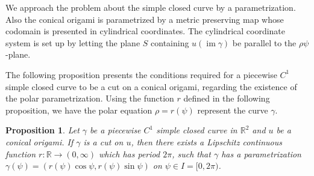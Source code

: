 \documentclass{amsart}
\theoremstyle{plain}
\newtheorem{proposition}[theorem]{Proposition}
\theoremstyle{definition}
\theoremstyle{remark}
\DeclareMathOperator{\im}{im}
\begin{document}
We approach the problem about the simple closed curve by a parametrization.
Also the conical origami is parametrized by a metric preserving map whose codomain is presented in cylindrical coordinates.
The cylindrical coordinate system is set up by letting the plane $S$ containing $u(\im\gamma)$ be parallel to the $\rho\psi$-plane. %

The following proposition presents the conditions required for a piecewise $C^1$ simple closed curve to be a cut on a conical origami, regarding the existence of the polar parametrization.
Using the function $r$ defined in the following proposition, we have the polar equation $\rho=r(\psi)$ represent the curve $\gamma$.



\begin{proposition}\label{2.1} %
Let $\gamma$ be a piecewise $C^1$ simple closed curve in $\mathbb{R}^2$ and $u$ be a conical origami. %
If $\gamma$ is a cut on $u$, then there exists a Lipschitz continuous function $r \colon \mathbb{R}\to(0,\infty)$ which has period $2\pi$, such that $\gamma$ has a parametrization $\gamma(\psi)=(r(\psi)\cos\psi,r(\psi)\sin\psi)$ on $\psi\in I=[0,2\pi)$.
\end{proposition}
\end{document}
